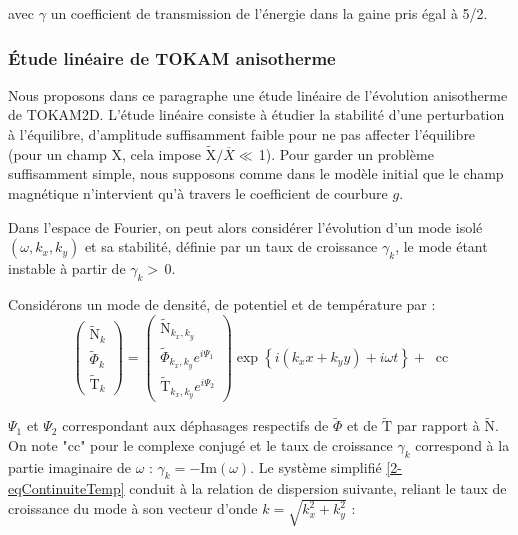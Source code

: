 \begin{refsection}
avec $\gamma$ un coefficient de transmission de l'énergie dans la gaine pris
égal à 5/2.

\subsubsection{Étude linéaire de TOKAM anisotherme}
Nous proposons dans ce paragraphe une étude linéaire de l'évolution anisotherme
de TOKAM2D. L'étude linéaire consiste à étudier la stabilité d'une perturbation à
l'équilibre, d'amplitude suffisamment faible pour ne pas affecter l'équilibre
(pour un champ ${\text{X}}$, cela impose
$\widetilde{\text{X}}/\overbar{X}\ll\,$1).
Pour garder un problème suffisamment simple, nous supposons comme dans le modèle
initial que le champ magnétique n'intervient qu'à travers le coefficient de
courbure $g$.

Dans l'espace de Fourier, on peut alors considérer l'évolution d'un mode isolé
$(\omega, k_x, k_y)$ et sa stabilité, définie par un taux de croissance
$\gamma_k$, le mode étant instable à partir de $\gamma_k>\,$0.

Considérons un mode de densité, de potentiel et de température par :
\begin{equation}
\begin{pmatrix}
\widetilde{\text{N}}_k\\\widetilde{\Phi}_k\\\widetilde{\text{T}}_k
\end{pmatrix}=
\begin{pmatrix}
\widetilde{\text{N}}_{k_x,k_y}\\\widetilde{\Phi}_{k_x,k_y}e^{i\Psi_1}\\\widetilde{\text{T}}_{k_x,k_y}e^{i\Psi_2}
\end{pmatrix}\exp\left\{i(k_xx+k_yy)+i\omega t\right\}+\;\;\text{cc}
\end{equation}

$\Psi_1$ et $\Psi_2$ correspondant aux déphasages respectifs de
$\widetilde{\Phi}$ et de $\widetilde{\text{T}}$ par rapport à
$\widetilde{\text{N}}$. On note "$\text{cc}$" pour le complexe conjugé et
le taux de croissance $\gamma_k$ correspond à la partie imaginaire de $\omega$
:
$\gamma_k=-\text{Im}(\omega)$.
Le système simplifié \eqref{2-eqContinuiteTemp} conduit à la relation de dispersion
suivante, reliant le taux de croissance du mode à son vecteur d'onde
$k=\sqrt{k_x^2+k_y^2}$ :


\end{refsection}
